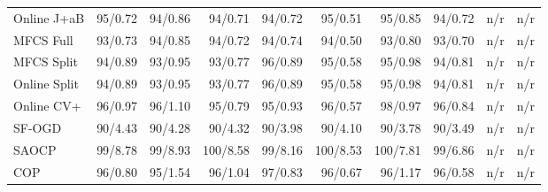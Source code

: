 \documentclass[11pt]{article}
\begin{document}
\begin{table}[h]
{\begin{tabular}{lrrrrrrrrr}
Online J+aB & 95/0.72 & 94/0.86 & 94/0.71 & 94/0.72 & 95/0.51 & 95/0.85 & 94/0.72 & n/r & n/r\\
MFCS Full & 93/0.73 & 94/0.85 & 94/0.72 & 94/0.74 & 94/0.50 & 93/0.80 & 93/0.70 & n/r & n/r\\
MFCS Split & 94/0.89 & 93/0.95 & 93/0.77 & 96/0.89 & 95/0.58 & 95/0.98 & 94/0.81 & n/r & n/r\\
Online Split & 94/0.89 & 93/0.95 & 93/0.77 & 96/0.89 & 95/0.58 & 95/0.98 & 94/0.81 & n/r & n/r\\
Online CV+ & 96/0.97 & 96/1.10 & 95/0.79 & 95/0.93 & 96/0.57 & 98/0.97 & 96/0.84 & n/r & n/r\\
SF-OGD & 90/4.43 & 90/4.28 & 90/4.32 & 90/3.98 & 90/4.10 & 90/3.78 & 90/3.49 & n/r & n/r\\
SAOCP & 99/8.78 & 99/8.93 & 100/8.58 & 99/8.16 & 100/8.53 & 100/7.81 & 99/6.86 & n/r & n/r\\
COP & 96/0.80 & 95/1.54 & 96/1.04 & 97/0.83 & 96/0.67 & 96/1.17 & 96/0.58 & n/r & n/r\\
\bottomrule\end{tabular}}\end{table}
\end{document}

